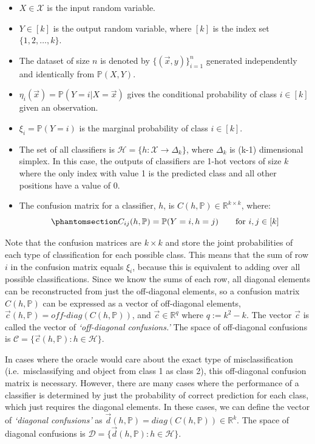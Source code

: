 \documentclass[
  letterpaper,
  numbers=noenddot,
  DIV=11]{scrreprt}
\theoremstyle{definition}
\theoremstyle{plain}
\theoremstyle{plain}
\theoremstyle{remark}
\begin{document}
\begin{itemize}
\item
  \(X \in \mathcal{X}\) is the input random variable.
\item
  \(Y \in [k]\) is the output random variable, where \([k]\) is the
  index set \(\{1, 2, \dots, k\}\).
\item
  The dataset of size \(n\) is denoted by \(\{(\vec{x}, y)\}_{i=1}^n\)
  generated independently and identically from \(\mathbb{P}(X, Y)\).
\item
  \(\eta_i(\vec{x}) = \mathbb{P}(Y=i | X=\vec{x})\) gives the
  conditional probability of class \(i \in [k]\) given an observation.
\item
  \(\xi_i = \mathbb{P}(Y=i)\) is the marginal probability of class
  \(i \in [k]\).
\item
  The set of all classifiers is
  \(\mathcal{H} = \{h : \mathcal{X} \rightarrow \Delta_k\}\), where
  \(\Delta_k\) is (k-1) dimensional simplex. In this case, the outputs
  of classifiers are 1-hot vectors of size \(k\) where the only index
  with value 1 is the predicted class and all other positions have a
  value of 0.
\item
  The confusion matrix for a classifier, \(h\), is
  \(C(h, \mathbb{P}) \in \mathbb{R}^{k \times k}\), where:
  \begin{equation}\phantomsection\label{eq-eq3.59}{C_{ij}(h, \mathbb{P}) = \mathbb{P}(Y=i, h=j) \text{\qquad for } i, j \in [k]}\end{equation}
\end{itemize}

Note that the confusion matrices are \(k\times k\) and store the joint
probabilities of each type of classification for each possible class.
This means that the sum of row \(i\) in the confusion matrix equals
\(\xi_i\), because this is equivalent to adding over all possible
classifications. Since we know the sums of each row, all diagonal
elements can be reconstructed from just the off-diagonal elements, so a
confusion matrix \(C(h, \mathbb{P})\) can be expressed as a vector of
off-diagonal elements,
\(\vec{c}(h, \mathbb{P}) = \textit{off-diag}(C(h, \mathbb{P}))\), and
\(\vec{c} \in \mathbb{R}^q\) where \(q := k^2 - k\). The vector
\(\vec{c}\) is called the vector of \emph{`off-diagonal confusions.'}
The space of off-diagonal confusions is
\(\mathcal{C} = \{\vec{c}(h, \mathbb{P}) : h \in \mathcal{H}\}\).

In cases where the oracle would care about the exact type of
misclassification (i.e.~misclassifying and object from class 1 as class
2), this off-diagonal confusion matrix is necessary. However, there are
many cases where the performance of a classifier is determined by just
the probability of correct prediction for each class, which just
requires the diagonal elements. In these cases, we can define the vector
of \emph{`diagonal confusions'} as
\(\vec{d}(h, \mathbb{P}) = \textit{diag}(C(h, \mathbb{P})) \in \mathbb{R}^k\).
The space of diagonal confusions is
\(\mathcal{D} = \{\vec{d}(h, \mathbb{P}) : h \in \mathcal{H}\}\).
\end{document}
